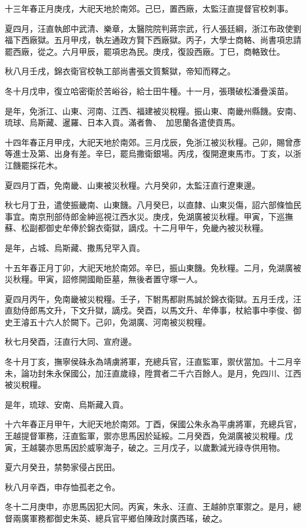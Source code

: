 \begin{pinyinscope}
十三年春正月庚戌，大祀天地於南郊。己巳，置西廠，太監汪直提督官校刺事。

夏四月，汪直執郎中武清、樂章，太醫院院判蔣宗武，行人張廷綱，浙江布政使劉福下西廠獄。五月甲戌，執左通政方賢下西廠獄。丙子，大學士商輅、尚書項忠請罷西廠，從之。六月甲辰，罷項忠為民。庚戌，復設西廠。丁巳，商輅致仕。

秋八月壬戌，錦衣衛官校執工部尚書張文質繫獄，帝知而釋之。

冬十月戊申，復立哈密衛於苦峪谷，給士田牛種。十一月，張瓚破松潘疊溪苗。

是年，免浙江、山東、河南、江西、福建被災稅糧。振山東、南畿州縣饑。安南、琉球、烏斯藏、暹羅、日本入貢。滿者魯、加思蘭各遣使貢馬。

十四年春正月甲戌，大祀天地於南郊。三月戊辰，免浙江被災秋糧。己卯，賜曾彥等進士及第、出身有差。辛巳，罷烏撒衛銀場。丙戌，復開遼東馬市。丁亥，以浙江饑罷採花木。

夏四月丁酉，免南畿、山東被災秋糧。六月癸卯，太監汪直行遼東邊。

秋七月丁丑，遣使振畿南、山東饑。八月癸巳，以直隸、山東災傷，詔六部條恤民事宜。南京刑部侍郎金紳巡視江西水災。庚戌，免湖廣被災秋糧。甲寅，下巡撫蘇、松副都御史牟俸於錦衣衛獄，謫戍。十二月甲午，免畿內被災秋糧。

是年，占城、烏斯藏、撒馬兒罕入貢。

十五年春正月丁卯，大祀天地於南郊。辛巳，振山東饑。免秋糧。二月，免湖廣被災秋糧。甲寅，詔修開國勛臣墓，無後者置守塚一人。

夏四月丙午，免南畿被災稅糧。壬子，下駙馬都尉馬誠於錦衣衛獄。五月壬戌，汪直劾侍郎馬文升，下文升獄，謫戍。癸酉，以馬文升、牟俸事，杖給事中李俊、御史王濬五十六人於闕下。己卯，免湖廣、河南被災稅糧。

秋七月癸酉，汪直行大同、宣府邊。

冬十月丁亥，撫寧侯硃永為靖虜將軍，充總兵官，汪直監軍，禦伏當加。十二月辛未，論功封朱永保國公，加汪直歲祿，陞賞者二千六百餘人。是月，免四川、江西被災稅糧。

是年，琉球、安南、烏斯藏入貢。

十六年春正月甲午，大祀天地於南郊。丁酉，保國公朱永為平虜將軍，充總兵官，王越提督軍務，汪直監軍，禦亦思馬因於延綏。二月癸酉，免湖廣被災稅糧。戊寅，王越襲亦思馬因於威寧海子，破之。三月戊子，以歲歉減光祿寺供用物。

夏六月癸丑，禁勢家侵占民田。

秋八月辛酉，申存恤孤老之令。

冬十二月庚申，亦思馬因犯大同。丙寅，朱永、汪直、王越帥京軍禦之。是月，總督兩廣軍務都御史朱英、總兵官平鄉伯陳政討廣西瑤，破之。


\end{pinyinscope}
